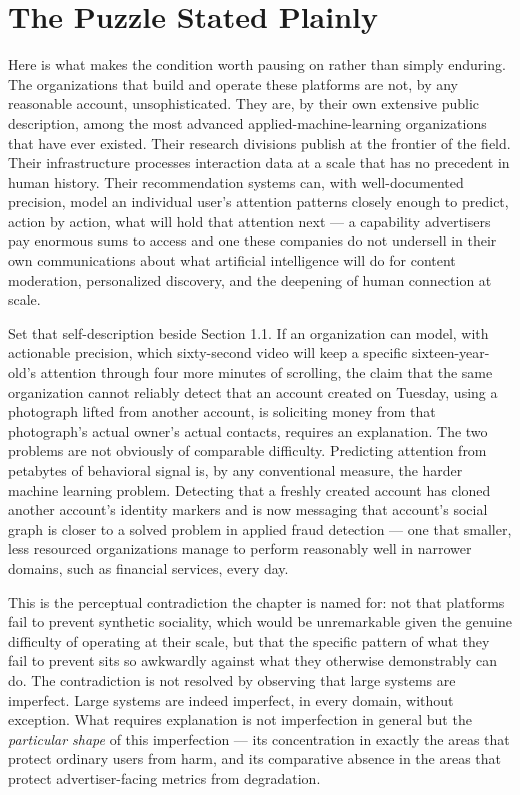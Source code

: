 \documentclass[12pt,a4paper]{book}
\begin{document}
\section{The Puzzle Stated Plainly}

Here is what makes the condition worth pausing on rather than simply enduring. The organizations that build and operate these platforms are not, by any reasonable account, unsophisticated. They are, by their own extensive public description, among the most advanced applied-machine-learning organizations that have ever existed. Their research divisions publish at the frontier of the field. Their infrastructure processes interaction data at a scale that has no precedent in human history. Their recommendation systems can, with well-documented precision, model an individual user's attention patterns closely enough to predict, action by action, what will hold that attention next — a capability advertisers pay enormous sums to access and one these companies do not undersell in their own communications about what artificial intelligence will do for content moderation, personalized discovery, and the deepening of human connection at scale.

Set that self-description beside Section 1.1. If an organization can model, with actionable precision, which sixty-second video will keep a specific sixteen-year-old's attention through four more minutes of scrolling, the claim that the same organization cannot reliably detect that an account created on Tuesday, using a photograph lifted from another account, is soliciting money from that photograph's actual owner's actual contacts, requires an explanation. The two problems are not obviously of comparable difficulty. Predicting attention from petabytes of behavioral signal is, by any conventional measure, the harder machine learning problem. Detecting that a freshly created account has cloned another account's identity markers and is now messaging that account's social graph is closer to a solved problem in applied fraud detection — one that smaller, less resourced organizations manage to perform reasonably well in narrower domains, such as financial services, every day.

This is the perceptual contradiction the chapter is named for: not that platforms fail to prevent synthetic sociality, which would be unremarkable given the genuine difficulty of operating at their scale, but that the specific pattern of what they fail to prevent sits so awkwardly against what they otherwise demonstrably can do. The contradiction is not resolved by observing that large systems are imperfect. Large systems are indeed imperfect, in every domain, without exception. What requires explanation is not imperfection in general but the \emph{particular shape} of this imperfection — its concentration in exactly the areas that protect ordinary users from harm, and its comparative absence in the areas that protect advertiser-facing metrics from degradation.
\end{document}
